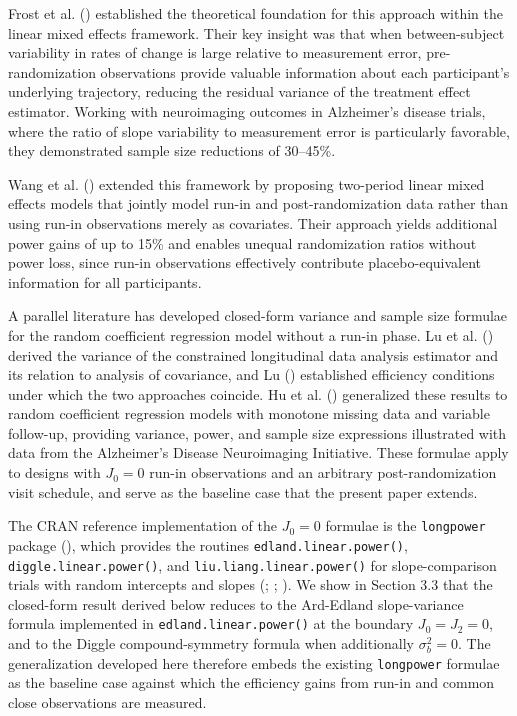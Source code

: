\documentclass[
  11pt,
]{article}
\begin{document}
Frost et al. ()
established the theoretical foundation for this approach within the
linear mixed effects framework. Their key insight was that when
between-subject variability in rates of change is large relative to
measurement error, pre-randomization observations provide valuable
information about each participant's underlying trajectory, reducing the
residual variance of the treatment effect estimator. Working with
neuroimaging outcomes in Alzheimer's disease trials, where the ratio of
slope variability to measurement error is particularly favorable, they
demonstrated sample size reductions of 30--45\%.

Wang et al. () extended this
framework by proposing two-period linear mixed effects models that
jointly model run-in and post-randomization data rather than using
run-in observations merely as covariates. Their approach yields
additional power gains of up to 15\% and enables unequal randomization
ratios without power loss, since run-in observations effectively
contribute placebo-equivalent information for all participants.

A parallel literature has developed closed-form variance and sample size
formulae for the random coefficient regression model without a run-in
phase. Lu et al. () derived the variance of
the constrained longitudinal data analysis estimator and its relation to
analysis of covariance, and Lu () established
efficiency conditions under which the two approaches coincide. Hu et al.
() generalized these results to random
coefficient regression models with monotone missing data and variable
follow-up, providing variance, power, and sample size expressions
illustrated with data from the Alzheimer's Disease Neuroimaging
Initiative. These formulae apply to designs with \(J_0 = 0\) run-in
observations and an arbitrary post-randomization visit schedule, and
serve as the baseline case that the present paper extends.

The CRAN reference implementation of the \(J_0=0\) formulae is the
\texttt{longpower} package (), which provides the routines \texttt{edland.linear.power()},
\texttt{diggle.linear.power()}, and \texttt{liu.liang.linear.power()}
for slope-comparison trials with random intercepts and slopes
(;
;
). We show in Section 3.3
that the closed-form result derived below reduces to the Ard-Edland
slope-variance formula implemented in \texttt{edland.linear.power()} at
the boundary \(J_0 = J_2 = 0\), and to the Diggle compound-symmetry
formula when additionally \(\sigma_b^2 = 0\). The generalization
developed here therefore embeds the existing \texttt{longpower} formulae
as the baseline case against which the efficiency gains from run-in and
common close observations are measured.
\end{document}
